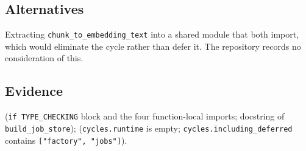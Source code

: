 \subsection*{Alternatives}

Extracting \texttt{chunk\_to\_embedding\_text} into a shared module that both
import, which would eliminate the cycle rather than defer it. The repository
records no consideration of this.

\noevidence

\subsection*{Evidence}

(\texttt{if TYPE\_CHECKING} block and the four function-local imports;
docstring of \texttt{build\_job\_store});
(\texttt{cycles.runtime} is empty; \texttt{cycles.including\_deferred}
contains \texttt{["factory", "jobs"]}).
